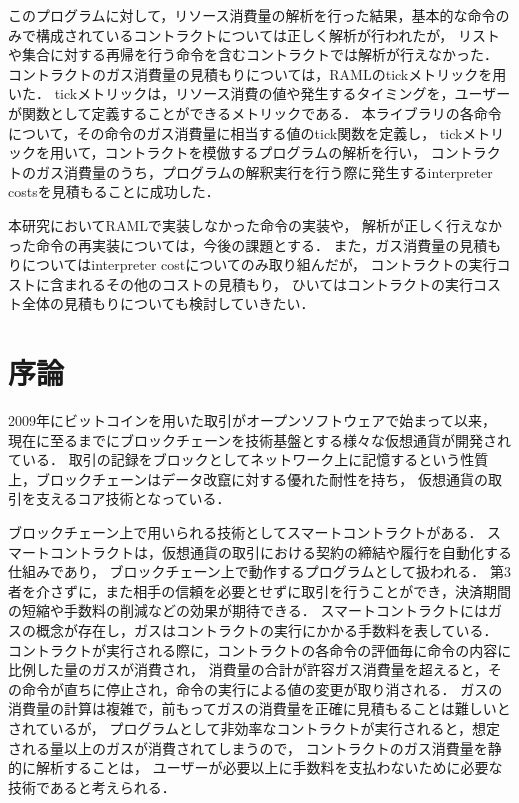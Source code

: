 \documentclass{kuisthesis}
\begin{document}
\begin{jabstract}
このプログラムに対して，リソース消費量の解析を行った結果，基本的な命令のみで構成されているコントラクトについては正しく解析が行われたが，
リストや集合に対する再帰を行う命令を含むコントラクトでは解析が行えなかった．
コントラクトのガス消費量の見積もりについては，RAMLのtickメトリックを用いた．
tickメトリックは，リソース消費の値や発生するタイミングを，ユーザーが関数として定義することができるメトリックである．
本ライブラリの各命令について，その命令のガス消費量に相当する値のtick関数を定義し，
tickメトリックを用いて，コントラクトを模倣するプログラムの解析を行い，
コントラクトのガス消費量のうち，プログラムの解釈実行を行う際に発生するinterpreter costsを見積もることに成功した．

本研究においてRAMLで実装しなかった命令の実装や，
解析が正しく行えなかった命令の再実装については，今後の課題とする．
また，ガス消費量の見積もりについてはinterpreter costについてのみ取り組んだが，
コントラクトの実行コストに含まれるその他のコストの見積もり，
ひいてはコントラクトの実行コスト全体の見積もりについても検討していきたい．


\end{jabstract}

\begin{eabstract}

\end{eabstract}

\tableofcontents

\section{序論}\label{sec-intro}
2009年にビットコインを用いた取引がオープンソフトウェアで始まって以来，
現在に至るまでにブロックチェーンを技術基盤とする様々な仮想通貨が開発されている．
取引の記録をブロックとしてネットワーク上に記憶するという性質上，ブロックチェーンはデータ改竄に対する優れた耐性を持ち，
仮想通貨の取引を支えるコア技術となっている．

ブロックチェーン上で用いられる技術としてスマートコントラクトがある．
スマートコントラクトは，仮想通貨の取引における契約の締結や履行を自動化する仕組みであり，
ブロックチェーン上で動作するプログラムとして扱われる．
第3者を介さずに，また相手の信頼を必要とせずに取引を行うことができ，決済期間の短縮や手数料の削減などの効果が期待できる．
スマートコントラクトにはガスの概念が存在し，ガスはコントラクトの実行にかかる手数料を表している．
コントラクトが実行される際に，コントラクトの各命令の評価毎に命令の内容に比例した量のガスが消費され，
消費量の合計が許容ガス消費量を超えると，その命令が直ちに停止され，命令の実行による値の変更が取り消される．
ガスの消費量の計算は複雑で，前もってガスの消費量を正確に見積もることは難しいとされているが，
プログラムとして非効率なコントラクトが実行されると，想定される量以上のガスが消費されてしまうので，
コントラクトのガス消費量を静的に解析することは，
ユーザーが必要以上に手数料を支払わないために必要な技術であると考えられる．
\end{document}
